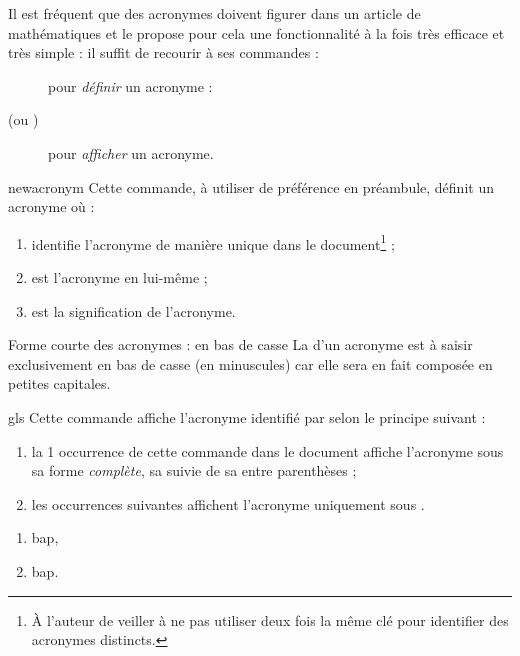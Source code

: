 \documentclass[french,nolocaltoc]{nwejmart}
\newtheorem[title=Fait,style=definition]{fact}
\begin{document}
Il est fréquent que des acronymes doivent figurer dans un article de
mathématiques et le  propose pour cela une fonctionnalité
à la fois très efficace et très simple : il suffit de recourir à ses commandes :
\begin{description}
\item[] pour \emph{définir} un acronyme :
\item[ (ou )] pour \emph{afficher} un acronyme.
\end{description}

\begin{docCommand}{newacronym}{}
  Cette commande, à utiliser de préférence en préambule, définit un acronyme
  où :
  \begin{enumerate}
  \item {} identifie l'acronyme de manière unique dans le
    document\footnote{À l'auteur de veiller à ne pas utiliser deux fois la même
      clé pour identifier des acronymes distincts.} ;
  \item {} est l'acronyme en lui-même ;
  \item {} est la signification de l'acronyme.
  \end{enumerate}
\begin{dbwarning}{Forme courte des acronymes : en bas de casse}{}
  La  d'un acronyme est à saisir exclusivement en bas de
  casse (en minuscules) car elle sera en fait composée en petites capitales.
\end{dbwarning}
\end{docCommand}

\begin{docCommand}{gls}{}
  Cette commande affiche l'acronyme identifié par  selon le principe
  suivant :
  \begin{enumerate}
  \item la 1\iere{} occurrence de cette commande dans le document affiche
    l'acronyme sous sa forme \emph{complète}, \ie*{} sa 
    suivie de sa  entre parenthèses ;
  \item les occurrences suivantes affichent l'acronyme uniquement sous
    .
  \end{enumerate}
\end{docCommand}

\begin{preamblecode}
\end{preamblecode}
\begin{bodycode}
\begin{enumerate}
\item \gls{bap},
\item \gls{bap}.
\end{enumerate}
\end{bodycode}
\end{document}
